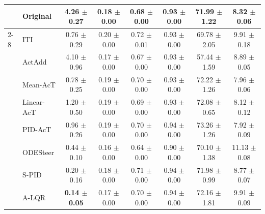 \documentclass{article}
\theoremstyle{plain}
\theoremstyle{definition}
\theoremstyle{remark}
\begin{document}
\begin{table}[H]
\begin{threeparttable}
\begin{tabular}{ll|>{\columncolor{lightblue}}c|ccc|c|c}
    & Original & 4.26 {\tiny $\pm$0.27} & 0.18 {\tiny $\pm$0.00} & 0.68 {\tiny $\pm$0.00} & 0.93 {\tiny $\pm$0.00} & 71.99 {\tiny $\pm$1.22} & 8.32 {\tiny $\pm$0.06} \\
    \cmidrule(lr){2-8}
    \multirow{8}{*}{\rotatebox{90}{Gemma-2-9B}} 
    & ITI & 0.76 {\tiny $\pm$0.29} & 0.20 {\tiny $\pm$0.00} & 0.72 {\tiny $\pm$0.01} & 0.93 {\tiny $\pm$0.00} & 69.78 {\tiny $\pm$2.05} & 9.91 {\tiny $\pm$0.18} \\
    & ActAdd & 4.10 {\tiny $\pm$0.96} & 0.17 {\tiny $\pm$0.00} & 0.67 {\tiny $\pm$0.00} & 0.93 {\tiny $\pm$0.00} & 57.44 {\tiny $\pm$1.59} & 8.89 {\tiny $\pm$0.05} \\
    & Mean-AcT & 0.78 {\tiny $\pm$0.25} & 0.19 {\tiny $\pm$0.00} & 0.70 {\tiny $\pm$0.00} & 0.93 {\tiny $\pm$0.00} & 72.22 {\tiny $\pm$1.26} & 7.96 {\tiny $\pm$0.06} \\
    & Linear-AcT & 1.20 {\tiny $\pm$0.50} & 0.19 {\tiny $\pm$0.00} & 0.69 {\tiny $\pm$0.00} & 0.93 {\tiny $\pm$0.00} & 72.08 {\tiny $\pm$0.65} & 8.12 {\tiny $\pm$0.12} \\
    & PID-AcT & 0.96 {\tiny $\pm$0.26} & 0.19 {\tiny $\pm$0.00} & 0.70 {\tiny $\pm$0.00} & 0.94 {\tiny $\pm$0.00} & 73.26 {\tiny $\pm$1.26} & 7.92 {\tiny $\pm$0.09} \\
    & ODESteer & 0.44 {\tiny $\pm$0.10} & 0.16 {\tiny $\pm$0.00} & 0.64 {\tiny $\pm$0.00} & 0.90 {\tiny $\pm$0.00} & 70.10 {\tiny $\pm$1.38} & 11.13 {\tiny $\pm$0.08} \\
    & S-PID &  0.20 {\tiny $\pm$0.16} & 0.18 {\tiny $\pm$0.00} & 0.71 {\tiny $\pm$0.00} & 0.94 {\tiny $\pm$0.00} & 71.98 {\tiny $\pm$0.99} & 8.77 {\tiny $\pm$0.07} \\
    & A-LQR & \textbf{0.14 {\tiny $\pm$0.05}} & 0.17 {\tiny $\pm$0.00} & 0.70 {\tiny $\pm$0.00} & 0.94 {\tiny $\pm$0.00} & 72.16 {\tiny $\pm$1.81} & 9.91 {\tiny $\pm$0.09} \\
    \midrule


\end{tabular}
\end{threeparttable}
\end{table}
\end{document}

